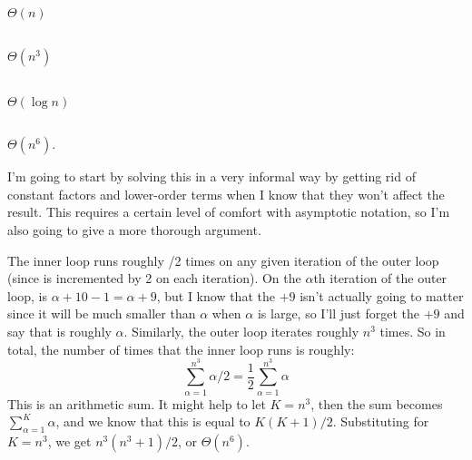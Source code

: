 \begin{prob}
\begin{subprobset}
\begin{subprob}
            \begin{soln}
                $\Theta(n)$
            \end{soln}

        \end{subprob}

        \begin{subprob}
            \inputminted{python}{\thisdir/include/part_f.py}

            \begin{soln}
                $\Theta(n^3)$
            \end{soln}

        \end{subprob}

        \begin{subprob}
            \inputminted{python}{\thisdir/include/part_g.py}
            
            \begin{soln}
                $\Theta(\log n)$
            \end{soln}

        \end{subprob}

        \begin{subprob}
            \inputminted{python}{\thisdir/include/part_h.py}
            
            \begin{soln}
                $\Theta(n^6)$.

                I'm going to start by solving this in a very informal way by
                getting rid of constant factors and lower-order terms when I
                know that they won't affect the result. This requires a certain
                level of comfort with asymptotic notation, so I'm also going to
                give a more thorough argument.

                The inner loop runs roughly /2 times on any given
                iteration of the outer loop (since  is incremented by
                2 on each iteration). On the $\alpha$th iteration of the outer
                loop,  is $\alpha + 10 - 1 = \alpha + 9$, but I know
                that the $+ 9$ isn't actually going to matter since it will be
                much smaller than $\alpha$ when $\alpha$ is large, so I'll just
                forget the $+ 9$ and say that  is roughly $\alpha$.
                Similarly, the outer loop iterates roughly $n^3$ times. So in
                total, the number of times that the inner loop runs is roughly:
                \[ \sum_{\alpha = 1}^{n^3} \alpha / 2 = \frac{1}{2}\sum_{\alpha
                = 1}^{n^3} \alpha \] This is an arithmetic sum. It might help
                to let $K = n^3$, then the sum becomes $\sum_{\alpha=1}^K
                \alpha$, and we know that this is equal to $K(K+1)/2$.
                Substituting for $K = n^3$, we get $n^3(n^3 + 1)/2$, or
                $\Theta(n^6)$.


\end{soln}
\end{subprob}
\end{subprobset}
\end{prob}
